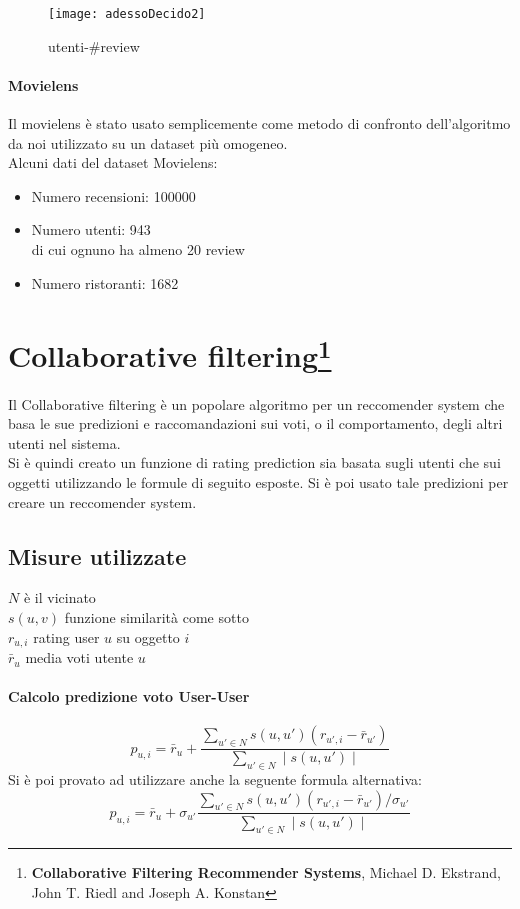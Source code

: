 \documentclass[12pt]{article}
\begin{document}
\begin{figure}[H]
\centering
\texttt{[image: adessoDecido2]}
\caption{utenti-\#review}
\end{figure}

\paragraph*{Movielens} Il movielens è stato usato semplicemente come metodo di confronto dell'algoritmo da noi utilizzato su un dataset più omogeneo.\\
Alcuni dati del dataset Movielens:\\
\begin{itemize}
\item Numero recensioni: 100000
\item Numero utenti: 943\\
di cui ognuno ha almeno 20 review
\item Numero ristoranti: 1682
\end{itemize}

\section*{Collaborative filtering\footnote{\textbf{Collaborative Filtering Recommender Systems}, Michael D. Ekstrand, John T. Riedl and Joseph A. Konstan}}
Il Collaborative filtering è un popolare algoritmo per un reccomender system che basa le sue predizioni e raccomandazioni sui voti, o il comportamento, degli altri utenti nel sistema.\\
Si è quindi creato un funzione di rating prediction sia basata sugli utenti che sui oggetti utilizzando le formule di seguito esposte. Si è poi usato tale predizioni per creare un reccomender system.

\subsection*{Misure utilizzate}
$N$ è il vicinato\\
$s(u, v)$ funzione similarità come sotto\\
$r_{u,i}$ rating user $u$ su oggetto $i$\\
$\bar{r}_u$ media voti utente $u$\\

\paragraph*{Calcolo predizione voto User-User}
\begin{equation}
p_{u,i} = \bar{r}_u + \frac{\sum_{u' \in N} s(u, u')(r_{u', i} - \bar{r}_{u'})}{\sum_{u' \in N} \mid s(u, u')\mid}
\label{predUser1}
\end{equation}
Si è poi provato ad utilizzare anche la seguente formula alternativa:
\begin{equation}
p_{u,i} = \bar{r}_u +\sigma_{u'} \frac{\sum_{u' \in N} s(u, u')(r_{u', i} - \bar{r}_{u'})/\sigma_{u'}}{\sum_{u' \in N} \mid s(u, u')\mid}
\label{predUser2}
\end{equation}
\end{document}

